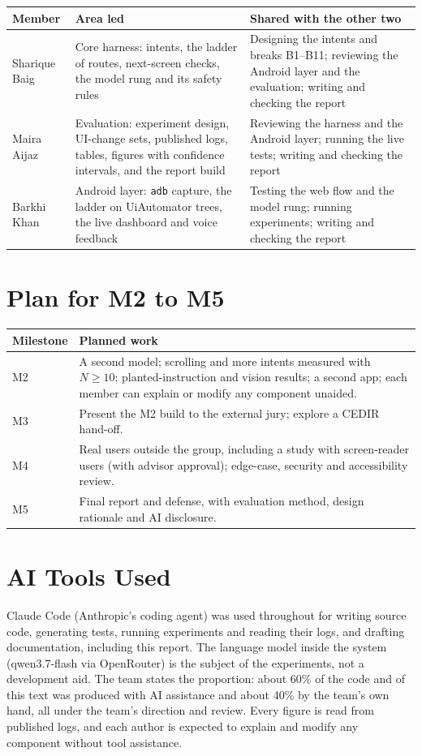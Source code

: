 \documentclass[11pt,a4paper]{article}
\begin{document}
\begin{table}[H]\centering\small
\begin{tabular}{p{3.2cm}p{4.4cm}p{6.2cm}}\toprule
Member & Area led & Shared with the other two \\ \midrule
Sharique Baig & Core harness: intents, the ladder of routes, next-screen checks, the model rung and its safety rules & Designing the intents and breaks B1--B11; reviewing the Android layer and the evaluation; writing and checking the report \\
Maira Aijaz & Evaluation: experiment design, UI-change sets, published logs, tables, figures with confidence intervals, and the report build & Reviewing the harness and the Android layer; running the live tests; writing and checking the report \\
Barkhi Khan & Android layer: \texttt{adb} capture, the ladder on UiAutomator trees, the live dashboard and voice feedback & Testing the web flow and the model rung; running experiments; writing and checking the report \\ \bottomrule
\end{tabular}
\end{table}

\section{Plan for M2 to M5}\label{sec:plan}
\begin{table}[H]\centering\small
\begin{tabular}{p{2.6cm}p{11.2cm}}\toprule
Milestone & Planned work \\ \midrule
M2 & A second model; scrolling and more intents measured with $N\ge10$; planted-instruction and vision results; a second app; each member can explain or modify any component unaided. \\
M3 & Present the M2 build to the external jury; explore a CEDIR hand-off. \\
M4 & Real users outside the group, including a study with screen-reader users (with advisor approval); edge-case, security and accessibility review. \\
M5 & Final report and defense, with evaluation method, design rationale and AI disclosure. \\ \bottomrule
\end{tabular}
\end{table}

\section{AI Tools Used}\label{sec:ai}
Claude Code (Anthropic's coding agent) was used throughout for writing source code, generating tests, running experiments and reading their logs, and drafting documentation, including this report. The language model inside the system (qwen3.7-flash via OpenRouter) is the subject of the experiments, not a development aid. The team states the proportion: about 60\% of the code and of this text was produced with AI assistance and about 40\% by the team's own hand, all under the team's direction and review. Every figure is read from published logs, and each author is expected to explain and modify any component without tool assistance.
\end{document}
